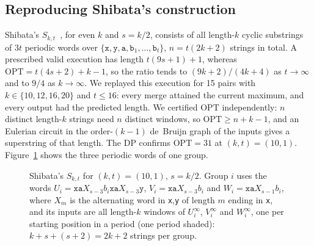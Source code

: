 \documentclass[11pt,a4paper]{article}   %
\newcommand{\cellrow}[3]{\foreach \ch [count=\ci from 0] in {#3}%
  {\node[strcell] at ({#1+\ci},#2) {\ch};}}
\newcommand{\shadecells}[4][ovfill]{\fill[#1] ({#2-0.5},{#4-0.5})
  rectangle ({#3+0.5},{#4+0.5});}
\theoremstyle{compact}
\theoremstyle{compactdef}
\newcommand{\OPT}{\mathrm{OPT}}
\newcommand{\str}[1]{\texttt{#1}}           %
\begin{document}
\subsection{Reproducing Shibata's construction}\label{sec:shibata-exp}
Shibata's $S_{k,t}$~\cite{Shi26}, for even $k$ and $s=k/2$, consists of all
length-$k$ cyclic substrings of $3t$ periodic words over
$\{\str{x},\str{y},\str{a},\str{b}_1,\dots,\str{b}_t\}$, $n=t(2k+2)$
strings in total. A prescribed valid execution has length $t(9s+1)+1$,
whereas $\OPT=t(4s+2)+k-1$, so the ratio tends to $(9k+2)/(4k+4)$ as
$t\to\infty$ and to $9/4$ as $k\to\infty$. We replayed this execution for 15
pairs with $k\in\{10,12,16,20\}$ and $t\le16$: every merge attained the
current maximum, and every output had the predicted length. We certified
$\OPT$ independently: $n$ distinct length-$k$ strings need $n$ distinct
windows, so $\OPT\ge n+k-1$, and an Eulerian circuit in the order-$(k-1)$
de~Bruijn graph of the inputs gives a superstring of that length. The DP
confirms $\OPT=31$ at $(k,t)=(10,1)$. Figure~\ref{fig:shibata} shows the
three periodic words of one group.

\begin{figure}[htb]\centering
{}
\caption{Shibata's $S_{k,t}$ for $(k,t)=(10,1)$, $s=k/2$. Group $i$ uses
the words $U_i=\str{xa}X_{s-3}b_i\str{xa}X_{s-3}\str{y}$,
$V_i=\str{xa}X_{s-3}b_i$ and $W_i=\str{xa}X_{s-1}b_i$, where $X_m$ is the
alternating word in \str{x},\str{y} of length $m$ ending in \str{x}, and
its inputs are all length-$k$ windows of $U_i^\infty$, $V_i^\infty$ and
$W_i^\infty$, one per starting position in a period (one period shaded):
$k+s+(s+2)=2k+2$ strings per group.}\label{fig:shibata}
\end{figure}
\end{document}
